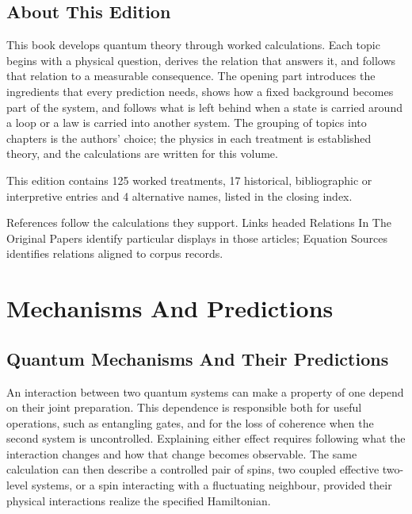 \documentclass[11pt,oneside]{book}
\begin{document}
\tableofcontents

\chapter*{About This Edition}

This book develops quantum theory through worked calculations. Each topic begins with a physical question, derives the relation that answers it, and follows that relation to a measurable consequence. The opening part introduces the ingredients that every prediction needs, shows how a fixed background becomes part of the system, and follows what is left behind when a state is carried around a loop or a law is carried into another system. The grouping of topics into chapters is the authors' choice; the physics in each treatment is established theory, and the calculations are written for this volume.

This edition contains 125 worked treatments, 17 historical, bibliographic or interpretive entries and 4 alternative names, listed in the closing index. 

References follow the calculations they support. Links headed Relations In The Original Papers identify particular displays in those articles; Equation Sources identifies relations aligned to corpus records.

\mainmatter

\part{Mechanisms And Predictions}

\chapter{Quantum Mechanisms And Their Predictions}\label{chap:mechanisms-predictions}

An interaction between two quantum systems can make a property of one depend
on their joint preparation. This dependence is responsible both for useful
operations, such as entangling gates, and for the loss of coherence when the
second system is uncontrolled. Explaining either effect requires following
what the interaction changes and how that change becomes observable. The same
calculation can then describe a controlled pair of spins, two coupled effective
two-level systems, or a spin interacting with a fluctuating neighbour, provided
their physical interactions realize the specified Hamiltonian.
\end{document}
